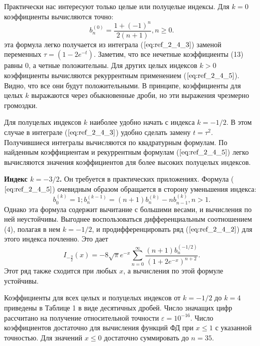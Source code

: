 Практически нас интересуют только целые или полуцелые индексы. Для
$k = 0$ коэффициенты вычисляются точно:
\begin{equation}
b_n^{(0)}=\frac{1+(-1)^n}{2(n+1)},n \geqslant 0.
\label{eq:ref_2_4_10}
\end{equation}
эта формула легко получается из интеграла ($\ref{eq:ref_2_4_3}$) заменой переменных
$\tau = (1 - 2e^{-t})$. Заметим, что все нечетные коэффициенты (13) равны 0, а четные
положительны. Для других целых индексов $k > 0$ коэффициенты вычисляются
рекуррентным применением ($\ref{eq:ref_2_4_5}$). Видно, что все они будут положительными. В
принципе, коэффициенты для целых $k$ выражаются через обыкновенные дроби,
но эти выражения чрезмерно громоздки.

Для полуцелых индексов $k$ наиболее удобно начать с индекса $k = -1/2$. В
этом случае в интеграле ($\ref{eq:ref_2_4_3}$) удобно сделать замену $t = \tau^2$. Получившиеся
интегралы вычисляются по квадратурным формулам. По найденным
коэффициентам и рекуррентным формулам ($\ref{eq:ref_2_4_5}$) легко вычисляются значения
коэффициентов для более высоких полуцелых индексов.

\textbf{Индекс $k = -3/2$.} Он требуется в практических приложениях. Формула
($\ref{eq:ref_2_4_5}$) очевидным образом обращается в сторону уменьшения индекса:
\begin{equation}
b_0^{(k)}=1;b_n^(k-1)=(n+1)b_n^{(k)}-nb_{n-1}^{(k)}, n > 1.
\label{eq:ref_2_4_11}
\end{equation}
Однако эта формула содержит вычитание с большими весами, и вычисления по
ней неустойчивы. Выгоднее воспользоваться дифференциальным
соотношением (4), полагая в нем $k = -1/2$, и продифференцировать ряд ($\ref{eq:ref_2_4_2}$) для
этого индекса почленно. Это дает
\begin{equation}
I_{-\frac{3}{2}}(x)=-8\sqrt{\pi}e^{-x}\sum\limits_{n=0}^{\infty} \frac{(n+1)b_n^{(-1/2)}}{(1+2e^{-x})^{n+2}}.
\label{eq:ref_2_4_12}
\end{equation}
Этот ряд также сходится при любых $x$, а вычисления по этой формуле
устойчивы.

Коэффициенты для всех целых и полуцелых индексов от $k = -1/2$ до $k = 4$
приведены в Таблице 1 в виде десятичных дробей. Число значащих цифр
рассчитано на получение относительной точности $\varepsilon = 10^{-16}$. Число
коэффициентов достаточно для вычисления функций ФД при $x \leqslant 1$ с указанной
точностью. Для значений $x \leqslant 0$ достаточно суммировать до $n = 35$.




